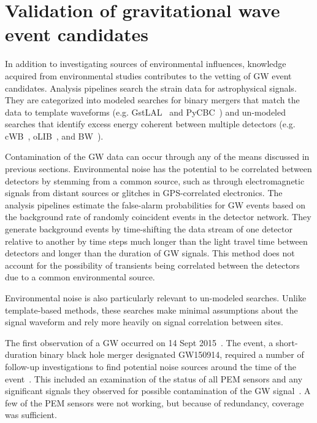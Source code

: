 \section{Validation of gravitational wave event candidates}\label{subsec:vetting}

In addition to investigating sources of environmental influences, knowledge acquired from environmental studies contributes to the vetting of \ac{GW} event candidates.
Analysis pipelines search the strain data for astrophysical signals.
They are categorized into modeled searches for binary mergers that match the data to template waveforms (e.g. GstLAL~\citep{Cannon_2012} and PyCBC~\citep{Usman_2016}) and un-modeled searches that identify excess energy coherent between multiple detectors (e.g. cWB~\citep{Klimenko_2008}, oLIB~\citep{Lynch_2017}, and BW~\citep{Cornish_2015}).

Contamination of the \ac{GW} data can occur through any of the means discussed in previous sections.
Environmental noise has the potential to be correlated between detectors by stemming from a common source, such as through electromagnetic signals from distant sources or glitches in GPS-correlated electronics.
The analysis pipelines estimate the false-alarm probabilities for GW events based on the background rate of randomly coincident events in the detector network.
They generate background events by time-shifting the data stream of one detector relative to another by time steps much longer than the light travel time between detectors and longer than the duration of GW signals.%
This method does not account for the possibility of transients being correlated between the detectors due to a common environmental source.

Environmental noise is also particularly relevant to un-modeled searches. Unlike template-based methods, these searches make minimal assumptions about the signal waveform and rely more heavily on signal correlation between sites.

The first observation of a \ac{GW} occurred on 14 Sept 2015~\citep{gw150914}.
The event, a short-duration binary black hole merger designated GW150914, required a number of follow-up investigations to find potential noise sources around the time of the event~\citep{Detchar_2016}.
This included an examination of the status of all \ac{PEM} sensors and any significant signals they observed for possible contamination of the GW signal~\citep{Schofield_150914}.
A few of the \ac{PEM} sensors were not working, but because of redundancy, coverage was sufficient.

